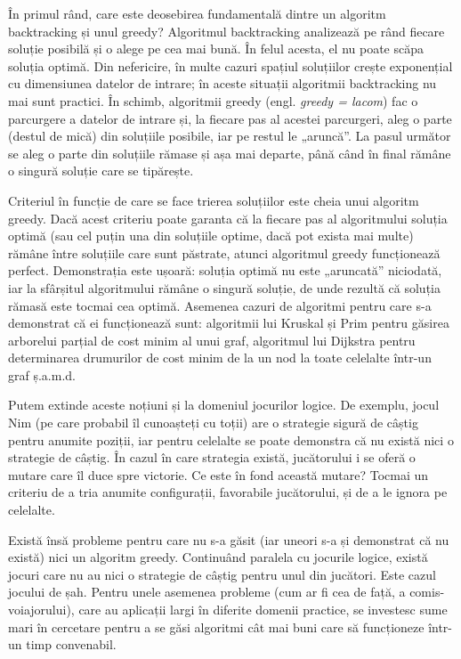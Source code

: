 În primul rând, care este deosebirea fundamentală dintre un algoritm
backtracking și unul greedy? Algoritmul backtracking analizează pe rând
fiecare soluție posibilă și o alege pe cea mai bună. În felul acesta, el nu
poate scăpa soluția optimă. Din nefericire, în multe cazuri spațiul soluțiilor
crește exponențial cu dimensiunea datelor de intrare; în aceste situații
algoritmii backtracking nu mai sunt practici. În schimb, algoritmii greedy
(engl. {\it greedy = lacom}) fac o parcurgere a datelor de intrare și, la
fiecare pas al acestei parcurgeri, aleg o parte (destul de mică) din soluțiile
posibile, iar pe restul le „aruncă”. La pasul următor se aleg o parte din
soluțiile rămase și așa mai departe, până când în final rămâne o singură
soluție care se tipărește.

Criteriul în funcție de care se face trierea soluțiilor este cheia unui
algoritm greedy. Dacă acest criteriu poate garanta că la fiecare pas al
algoritmului soluția optimă (sau cel puțin una din soluțiile optime, dacă pot
exista mai multe) rămâne între soluțiile care sunt păstrate, atunci algoritmul
greedy funcționează perfect. Demonstrația este ușoară: soluția optimă nu este
„aruncată” niciodată, iar la sfârșitul algoritmului rămâne o singură soluție,
de unde rezultă că soluția rămasă este tocmai cea optimă. Asemenea cazuri de
algoritmi pentru care s-a demonstrat că ei funcționează sunt: algoritmii lui
Kruskal și Prim pentru găsirea arborelui parțial de cost minim al unui graf,
algoritmul lui Dijkstra pentru determinarea drumurilor de cost minim de la un
nod la toate celelalte într-un graf ș.a.m.d.

Putem extinde aceste noțiuni și la domeniul jocurilor logice. De exemplu,
jocul Nim (pe care probabil îl cunoașteți cu toții) are o strategie sigură de
câștig pentru anumite poziții, iar pentru celelalte se poate demonstra că nu
există nici o strategie de câștig. În cazul în care strategia există,
jucătorului i se oferă o mutare care îl duce spre victorie. Ce este în fond
această mutare? Tocmai un criteriu de a tria anumite configurații, favorabile
jucătorului, și de a le ignora pe celelalte.

Există însă probleme pentru care nu s-a găsit (iar uneori s-a și demonstrat că
nu există) nici un algoritm greedy. Continuând paralela cu jocurile logice,
există jocuri care nu au nici o strategie de câștig pentru unul din
jucători. Este cazul jocului de șah. Pentru unele asemenea probleme (cum ar fi
cea de față, a comis-voiajorului), care au aplicații largi în diferite domenii
practice, se investesc sume mari în cercetare pentru a se găsi algoritmi cât
mai buni care să funcționeze într-un timp convenabil.

